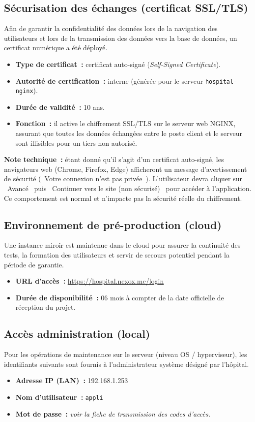 \documentclass[11pt,a4paper]{article}
\begin{document}
\subsection{Sécurisation des échanges (certificat SSL/TLS)}
Afin de garantir la confidentialité des données lors de la navigation des utilisateurs et lors de la transmission des données vers la base de données, un certificat numérique a été déployé.
\begin{itemize}
  \item \textbf{Type de certificat~:} certificat auto-signé (\emph{Self-Signed Certificate}).
  \item \textbf{Autorité de certification~:} interne (générée pour le serveur \texttt{hospital-nginx}).
  \item \textbf{Durée de validité~:} 10 ans.
  \item \textbf{Fonction~:} il active le chiffrement SSL/TLS sur le serveur web NGINX, assurant que toutes les données échangées entre le poste client et le serveur sont illisibles pour un tiers non autorisé.
\end{itemize}
\textbf{Note technique~:} étant donné qu'il s'agit d'un certificat auto-signé, les navigateurs web (Chrome, Firefox, Edge) afficheront un message d'avertissement de sécurité (\og~Votre connexion n'est pas privée~\fg{}). L'utilisateur devra cliquer sur \og~Avancé~\fg{} puis \og~Continuer vers le site (non sécurisé)~\fg{} pour accéder à l'application. Ce comportement est normal et n'impacte pas la sécurité réelle du chiffrement.

\subsection{Environnement de pré-production (cloud)}
Une instance miroir est maintenue dans le cloud pour assurer la continuité des tests, la formation des utilisateurs et servir de secours potentiel pendant la période de garantie.
\begin{itemize}
  \item \textbf{URL d'accès~:} \url{https://hospital.nexox.me/login}
  \item \textbf{Durée de disponibilité~:} 06 mois à compter de la date officielle de réception du projet.
\end{itemize}

\subsection{Accès administration (local)}
Pour les opérations de maintenance sur le serveur (niveau OS / hyperviseur), les identifiants suivants sont fournis à l'administrateur système désigné par l'hôpital.
\begin{itemize}
  \item \textbf{Adresse IP (LAN)~:} 192.168.1.253
  \item \textbf{Nom d'utilisateur~:} \texttt{appli}
  \item \textbf{Mot de passe~:} \emph{voir la fiche de transmission des codes d'accès.}
\end{itemize}
\end{document}
